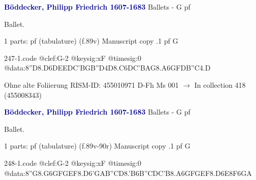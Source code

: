 \documentclass[twocolumn]{book}
\begin{document}
\newline \par \vspace{7pt} \textcolor{darkblue}{\textbf{Böddecker, Philipp Friedrich  1607-1683}}
\newline Ballets - G
\newline pf
\newline \begin{itshape}[f.89v, at left:] Ballet.\end{itshape} 
\newline \textcolor{darkblue}{}  1 parts: pf (tabulature)  (f.89v)
\newline Manuscript copy
.1  pf  G  
\begin{filecontents*}{247-1.code}
@clef:G-2
@keysig:xF
@timesig:0
@data:8''D{8.D6D}{EEDC}{'BGB''D}4D{8.C6D}{C'BAG}{8.A6G}{FDB''C}4.D
\end{filecontents*}
\newline
%

\newline Ohne alte Foliierung
\newline RISM-ID: 455010971
\newline D-Fh  Ms 001
\newline $\rightarrow$ In collection 418 (455008343)
      
\newline \par \vspace{7pt} \textcolor{darkblue}{\textbf{Böddecker, Philipp Friedrich  1607-1683}}
\newline Ballets - G
\newline pf
\newline \begin{itshape}[f.89v, at left:] Ballet.\end{itshape} 
\newline \textcolor{darkblue}{}  1 parts: pf (tabulature)  (f.89v-90r)
\newline Manuscript copy
.1  pf  G  
\begin{filecontents*}{248-1.code}
@clef:G-2
@keysig:xF
@timesig:0
@data:8''G{8.G6G}{FGEF}{8.D6'G}{AB''CD}{8.'B6B}{''CDC'B}{8.A6G}{FGEF}{8.D6E}{8F6GA}
\end{filecontents*}
\newline
%
\end{document}
